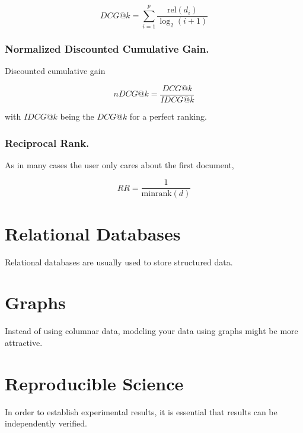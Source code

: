 \begin{equation}
	\textit{DCG}@k = \sum^p_{i=1} \frac{\text{rel}(d_i)}{\log_2(i+1)}
\end{equation}

\subsubsection{Normalized Discounted Cumulative Gain.}
Discounted cumulative gain 

\begin{equation}
	\textit{nDCG}@k = \frac{\textit{DCG}@k}{\textit{IDCG}@k} 
\end{equation}

with $\textit{IDCG}@k$ being the $\textit{DCG}@k$ for a perfect ranking. 

\subsubsection{Reciprocal Rank.} 
As in many cases the user only cares about the first document, 

\begin{equation}
	\textit{RR} = \frac{1}{\text{minrank}(d)}
\end{equation}


\section{Relational Databases}
Relational databases are usually used to store structured data. 

\section{Graphs}
Instead of using columnar data, modeling your data using graphs might be more attractive. 

\section{Reproducible Science}
In order to establish experimental results, it is essential that results can be independently verified. 